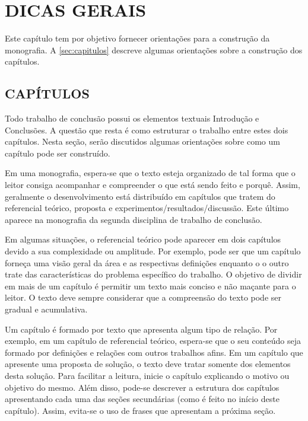 \chapter{DICAS GERAIS}
\label{cap:dicas}
	
Este capítulo tem por objetivo fornecer orientações para a construção da monografia. A \autoref{sec:capitulos} descreve algumas orientações sobre a construção dos capítulos. 

\section{CAPÍTULOS} 
\label{sec:capitulos} 

Todo trabalho de conclusão possui os elementos textuais Introdução e Conclusões. A questão que resta é como estruturar o trabalho entre estes dois capítulos. Nesta seção, serão discutidos algumas orientações sobre como um capítulo pode ser construído. 

Em uma monografia, espera-se que o texto esteja organizado de tal forma que o leitor consiga acompanhar e compreender o que está sendo feito e porquê. Assim, geralmente o desenvolvimento está distribuído em capítulos que tratem do referencial teórico, proposta e experimentos/resultados/discussão. Este último aparece na monografia da segunda disciplina de trabalho de conclusão. 

Em algumas situações, o referencial teórico pode aparecer em dois capítulos devido a sua complexidade ou amplitude. Por exemplo, pode ser que um capítulo forneça uma visão geral da área e as respectivas definições enquanto o o outro trate das características do problema específico do trabalho. O objetivo de dividir em mais de um capítulo é permitir um texto mais conciso e não maçante para o leitor. O texto deve sempre considerar que a compreensão do texto pode ser gradual e acumulativa. 

Um capítulo é formado por texto que apresenta algum tipo de relação. Por exemplo, em um capítulo de referencial teórico, espera-se que o seu conteúdo seja formado por definições e relações com outros trabalhos afins. Em um capítulo que apresente uma proposta de solução, o texto deve tratar somente dos elementos desta solução. Para facilitar a leitura, inicie o capítulo explicando o motivo ou objetivo do mesmo. Além disso, pode-se descrever a estrutura dos capítulos apresentando cada uma das seções secundárias (como é feito no início deste capítulo). Assim, evita-se o uso de frases que apresentam a próxima seção. 

